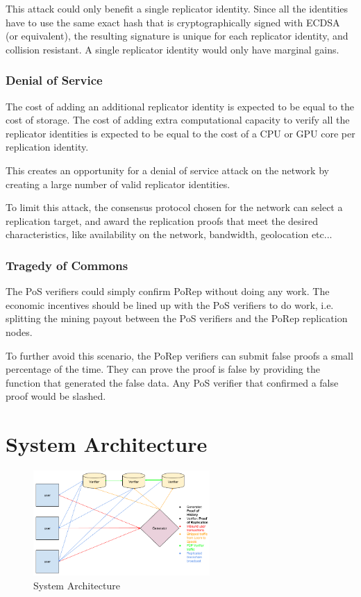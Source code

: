 \documentclass[12pt]{article}
\begin{document}
This attack could only benefit a single replicator identity. Since all the identities have to use the same exact hash that is cryptographically signed with ECDSA (or equivalent), the resulting signature is unique for each replicator identity, and collision resistant. A single replicator identity would only have marginal gains.
\subsubsection{Denial of Service}
The cost of adding an additional replicator identity is expected to be equal to the cost of storage. The cost of adding extra computational capacity to verify all the replicator identities is expected to be equal to the cost of a CPU or GPU core per replication identity.

This creates an opportunity for a denial of service attack on the network by creating a large number of valid replicator identities.

To limit this attack, the consensus protocol chosen for the network can select a replication target, and award the replication proofs that meet the desired characteristics, like availability on the network, bandwidth, geolocation etc...
\subsubsection{Tragedy of Commons}

The PoS verifiers could simply confirm PoRep without doing any work. The economic incentives should be lined up with the PoS verifiers to do work, i.e. splitting the mining payout between the PoS verifiers and the PoRep replication nodes.

To further avoid this scenario, the PoRep verifiers can submit false proofs a small percentage of the time. They can prove the proof is false by providing the function that generated the false data. Any PoS verifier that confirmed a false proof would be slashed.

\section{System Architecture}\label{system_architecture}

\begin{figure}
  \begin{center}
    \centering
    \includegraphics[width=0.6\textwidth]{figures/fig_9.png}
    \caption[Fig 9]{System Architecture \label{fig_9}}
  \end{center}
  \end{figure}
\end{document}
